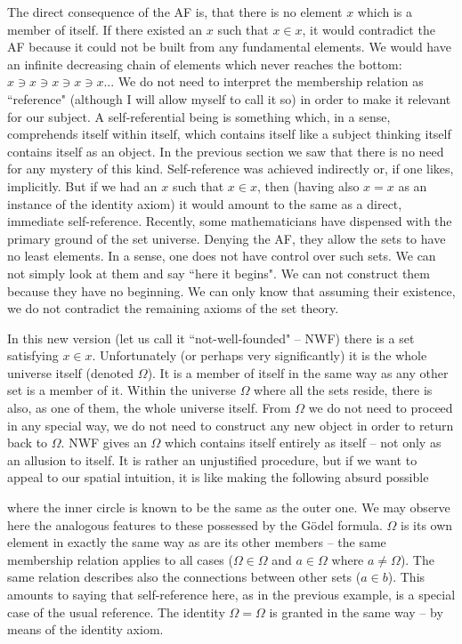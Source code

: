 The direct consequence of the AF is, that there is no element $x$ which is a member of itself. If there existed an $x$ 
such that $x\in x$, it would contradict the AF because it could not be built from any fundamental elements. We would 
have an infinite decreasing chain of elements which never reaches the bottom: 
$x\ni x\ni x\ni x\ni x ...$
We do not need to interpret the membership relation as ``reference" (although I will allow myself to call it so) in 
order to make it relevant for our subject. A self-referential being is something which, in a sense, comprehends 
itself within itself, which contains itself like a subject thinking itself contains itself as an object. In the previous 
section we saw that there is no need for any mystery of this kind. Self-reference was achieved indirectly or, if one 
likes, implicitly. But if we had an $x$ such that $x\in x$, then (having also $x=x$ as an instance of the identity axiom) it 
would amount to the same as a direct, immediate self-reference.
Recently, some mathematicians have dispensed with the primary ground of the set universe. Denying the AF, 
they allow the sets to have no least elements. In a sense, one does not have control over such sets. We can not 
simply look at them and say ``here it begins". We can not construct them because they have no beginning. We can 
only know that assuming their existence, we do not contradict the remaining axioms of the set theory. 

In this new version (let us call it ``not-well-founded" -- NWF) there is a set satisfying 
$x\in x$. Unfortunately (or 
perhaps very significantly) it is the whole universe itself (denoted $\Omega$). It is a member of itself in the same way 
as any other set is a member of it. Within the universe $\Omega$ where all the sets reside, there is also, as one of them, 
the whole universe itself. From $\Omega$ we do not need to proceed in any special way, we do not need to construct any 
new object in order to return back to $\Omega$. NWF gives an $\Omega$ which contains itself entirely as itself -- not only as an 
allusion to itself. It is rather an unjustified procedure, but if we want to appeal to our spatial intuition, it is like 
making the following absurd possible
\begin{center}
                
\end{center}
where the inner circle is known to be the same as the outer one. 
We may observe here the analogous features to these possessed by the G\"{o}del formula. $\Omega$ is its own element in 
exactly the same way as are its other members --  the same membership relation 
applies to all cases ($\Omega\in \Omega$ and $a\in \Omega$  
where $a\not =\Omega$). The same relation describes also the connections between other sets 
($a\in b$). This amounts to saying 
that self-reference here, as in the previous example, is a special case of the usual 
reference. The identity $\Omega = \Omega$ is 
granted in the same way -- by means of the identity axiom. 

